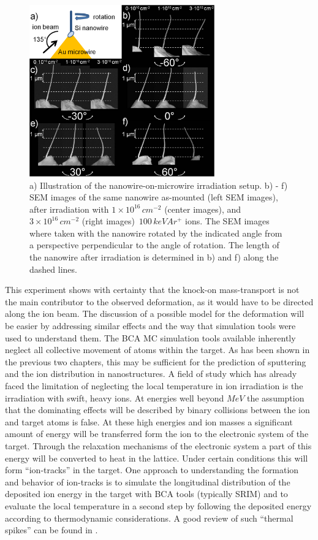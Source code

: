 \begin{figure}[thbp]
	\centering
		\includegraphics[width=8cm]{images/reverseangle.jpg}
	\caption{ a) Illustration of the nanowire-on-microwire irradiation setup. b) - f) SEM images of the same nanowire as-mounted (left SEM images), after irradiation with $1\times10^{16}\,cm^{-2}$  (center images), and $3\times10^{16}\,cm^{-2}$ (right images) $\,100\,keV Ar^+$ ions. The SEM images where taken with the nanowire rotated by the indicated angle from a perspective perpendicular to the angle of rotation. The length of the nanowire after irradiation is determined in b) and f) along the dashed lines.}
	\label{reverseangle}
\end{figure}

This experiment shows with certainty that the knock-on mass-transport is not the main contributor to the observed deformation, as it would have to be directed along the ion beam. The discussion of a possible model for the deformation will be easier by addressing similar effects and the way that simulation tools were used to understand them. The BCA MC simulation tools available inherently neglect all collective movement of atoms within the target. As has been shown in the previous two chapters, this may be sufficient for the prediction of sputtering and the ion distribution in nanostructures. A field of study which has already faced the limitation of neglecting the local temperature in ion irradiation is the irradiation with swift, heavy ions. At energies well beyond $MeV$ the assumption that the dominating effects will be described by binary collisions between the ion and target atoms is false. At these high energies and ion masses a significant amount of energy will be transferred form the ion to the electronic system of the target. Through the relaxation mechanisms of the electronic system a part of this energy will be converted to heat in the lattice. Under certain conditions this will form ``ion-tracks'' in the target. One approach to understanding the formation and behavior of ion-tracks is to simulate the longitudinal distribution of the deposited ion energy in the target with BCA tools (typically SRIM) and to evaluate the local temperature in a second step by following the deposited energy according to thermodynamic considerations. A good review of such ``thermal spikes'' can be found in \cite{wesch_effect_2004}. 


